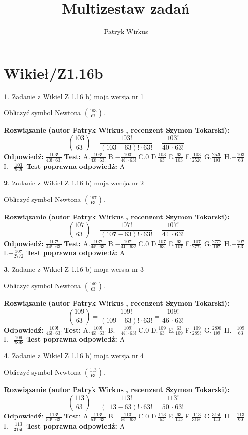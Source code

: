 \documentclass[12pt, a4paper]{article}
\title{Multizestaw zadań}
\author{Patryk Wirkus}
\date{}
\theoremstyle{definition} %
\newtheorem{zad}{}
\newcommand{\kategoria}[1]{\section{#1}}
\newcommand{\zadStart}[1]{\begin{zad}#1\newline}
\newcommand{\zadStop}{\end{zad}}
\newcommand{\rozwStart}[2]{\noindent \textbf{Rozwiązanie (autor #1 , recenzent #2): }\newline}
\newcommand{\rozwStop}{\newline}
\newcommand{\odpStart}{\noindent \textbf{Odpowiedź:}\newline}
\newcommand{\odpStop}{\newline}
\newcommand{\testStart}{\noindent \textbf{Test:}\newline}
\newcommand{\testStop}{\newline}
\newcommand{\kluczStart}{\noindent \textbf{Test poprawna odpowiedź:}\newline}
\newcommand{\kluczStop}{\newline}
\begin{document}
\maketitle

\kategoria{Wikieł/Z1.16b}


\zadStart{Zadanie z Wikieł Z 1.16 b) moja wersja nr 1}

Obliczyć symbol Newtona ${103 \choose 63}$.
\zadStop
\rozwStart{Patryk Wirkus}{Szymon Tokarski}
$${103 \choose 63} = \frac{103!}{(103-63)! \cdot 63!} = \frac{103!}{40! \cdot 63!}$$
\rozwStop
\odpStart
$\frac{103!}{40! \cdot 63!}$
\odpStop
\testStart
A.$\frac{103!}{40! \cdot 63!}$ B.$-\frac{103!}{40! \cdot 63!}$ C.$0$ D.$\frac{103}{63}$ E.$\frac{63}{103}$
F.$\frac{103}{2520}$ G.$\frac{2520}{103}$
H.$-\frac{103}{63}$
I.$-\frac{103}{2520}$
\testStop
\kluczStart
A
\kluczStop



\zadStart{Zadanie z Wikieł Z 1.16 b) moja wersja nr 2}

Obliczyć symbol Newtona ${107 \choose 63}$.
\zadStop
\rozwStart{Patryk Wirkus}{Szymon Tokarski}
$${107 \choose 63} = \frac{107!}{(107-63)! \cdot 63!} = \frac{107!}{44! \cdot 63!}$$
\rozwStop
\odpStart
$\frac{107!}{44! \cdot 63!}$
\odpStop
\testStart
A.$\frac{107!}{44! \cdot 63!}$ B.$-\frac{107!}{44! \cdot 63!}$ C.$0$ D.$\frac{107}{63}$ E.$\frac{63}{107}$
F.$\frac{107}{2772}$ G.$\frac{2772}{107}$
H.$-\frac{107}{63}$
I.$-\frac{107}{2772}$
\testStop
\kluczStart
A
\kluczStop



\zadStart{Zadanie z Wikieł Z 1.16 b) moja wersja nr 3}

Obliczyć symbol Newtona ${109 \choose 63}$.
\zadStop
\rozwStart{Patryk Wirkus}{Szymon Tokarski}
$${109 \choose 63} = \frac{109!}{(109-63)! \cdot 63!} = \frac{109!}{46! \cdot 63!}$$
\rozwStop
\odpStart
$\frac{109!}{46! \cdot 63!}$
\odpStop
\testStart
A.$\frac{109!}{46! \cdot 63!}$ B.$-\frac{109!}{46! \cdot 63!}$ C.$0$ D.$\frac{109}{63}$ E.$\frac{63}{109}$
F.$\frac{109}{2898}$ G.$\frac{2898}{109}$
H.$-\frac{109}{63}$
I.$-\frac{109}{2898}$
\testStop
\kluczStart
A
\kluczStop



\zadStart{Zadanie z Wikieł Z 1.16 b) moja wersja nr 4}

Obliczyć symbol Newtona ${113 \choose 63}$.
\zadStop
\rozwStart{Patryk Wirkus}{Szymon Tokarski}
$${113 \choose 63} = \frac{113!}{(113-63)! \cdot 63!} = \frac{113!}{50! \cdot 63!}$$
\rozwStop
\odpStart
$\frac{113!}{50! \cdot 63!}$
\odpStop
\testStart
A.$\frac{113!}{50! \cdot 63!}$ B.$-\frac{113!}{50! \cdot 63!}$ C.$0$ D.$\frac{113}{63}$ E.$\frac{63}{113}$
F.$\frac{113}{3150}$ G.$\frac{3150}{113}$
H.$-\frac{113}{63}$
I.$-\frac{113}{3150}$
\testStop
\kluczStart
A
\kluczStop
\end{document}

